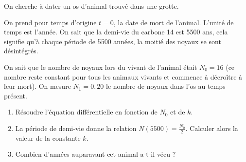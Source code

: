 \documentclass[11pt,class=report,crop=false]{standalone}
\begin{document}
On cherche à dater un os d'animal trouvé dans une grotte.

On prend pour temps d'origine $t=0$, la date de mort de l'animal. L'unité de temps est l'année. On sait que la \og{}demi-vie\fg{} du carbone 14 est 5500 ans, cela signifie qu'à chaque période de 5500 années, la moitié des noyaux se sont désintégrés.

On sait que le nombre de noyaux lors du vivant de l'animal était $N_0=16$ (ce nombre reste constant pour tous les animaux  vivants et commence à décroître à leur mort). On mesure $N_1 = 0,20$ le nombre de noyaux dans l'os au temps présent.
\begin{enumerate}
  \item Résoudre l'équation différentielle en fonction de $N_0$ et de $k$.
  \item La période de demi-vie donne la relation $N(5500)=\frac{N_0}{2}$. Calculer alors la valeur de la constante $k$.
  \item Combien d'années auparavant cet animal a-t-il vécu ?
\end{enumerate} 
\finenonce

\finexercice
\end{document}
